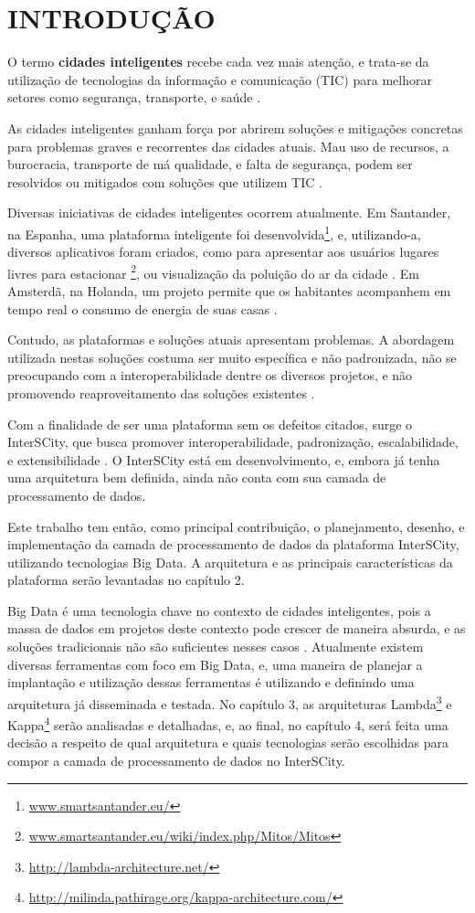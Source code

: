 \chapter[INTRODUÇÃO]{INTRODUÇÃO}

O termo \textbf{cidades inteligentes} recebe cada vez mais atenção, e trata-se
da utilização de tecnologias da informação e comunicação (TIC) para melhorar
setores como segurança, transporte, e saúde \cite{batty2012smart}.

As cidades inteligentes ganham força por abrirem soluções e mitigações
concretas para problemas graves e recorrentes das cidades atuais. Mau uso de
recursos, a burocracia, transporte de má qualidade, e falta de segurança,
podem ser resolvidos ou mitigados com soluções que utilizem
TIC \cite{batty2012smart}.

Diversas iniciativas de cidades inteligentes ocorrem atualmente. Em Santander,
na Espanha, uma plataforma inteligente foi
desenvolvida\footnote{\url{www.smartsantander.eu/}}, e, utilizando-a,
diversos aplicativos foram criados, como para apresentar aos usuários lugares
livres para estacionar
\footnote{\url{www.smartsantander.eu/wiki/index.php/Mitos/Mitos}}, ou visualização
da poluição do ar da cidade \cite{santana2016software}. Em Amsterdã, na Holanda,
um projeto permite que os habitantes acompanhem em tempo real o consumo de
energia de suas casas \cite{kon2016}.

Contudo, as plataformas e soluções atuais apresentam problemas. A abordagem
utilizada nestas soluções costuma ser muito específica e não padronizada, não
se preocupando com a interoperabilidade dentre os diversos projetos, e não
promovendo reaproveitamento das soluções existentes \cite{delesposte2017}.

Com a finalidade de ser uma plataforma sem os defeitos citados, surge o
InterSCity, que busca promover interoperabilidade, padronização,
escalabilidade, e extensibilidade \cite{delesposte2017}. O InterSCity está em
desenvolvimento, e, embora já tenha uma arquitetura bem definida, ainda não
conta com sua camada de processamento de dados.

Este trabalho tem então, como principal contribuição, o planejamento, desenho,
e implementação da camada de processamento de dados da plataforma InterSCity,
utilizando tecnologias Big Data. A arquitetura e as principais características
da plataforma serão levantadas no capítulo 2.

Big Data é uma tecnologia chave no contexto de cidades inteligentes, pois a
massa de dados em projetos deste contexto pode crescer de maneira absurda, e as
soluções tradicionais não são suficientes nesses casos \cite{batty2012smart}.
Atualmente existem diversas ferramentas com foco em Big Data, e, uma maneira de
planejar a implantação e utilização dessas ferramentas é utilizando e definindo
uma arquitetura já disseminada e testada. No capítulo 3, as arquiteturas
Lambda\footnote{\url{http://lambda-architecture.net/}} e
Kappa\footnote{\url{http://milinda.pathirage.org/kappa-architecture.com/}}
serão analisadas e detalhadas, e, ao final, no capítulo 4, será feita uma
decisão a respeito de qual arquitetura e quais tecnologias serão escolhidas
para compor a camada de processamento de dados no InterSCity.
